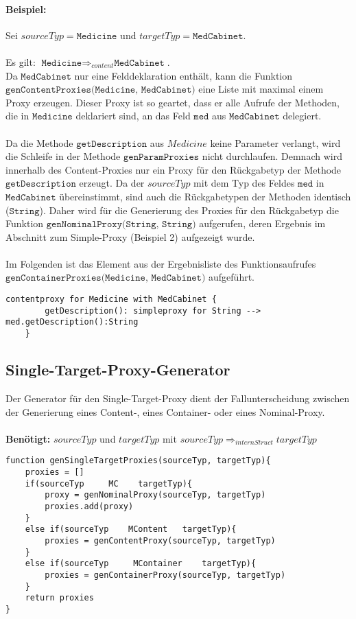 \documentclass[a4paper,12pt]{article}
\begin{document}
\paragraph{Beispiel: }Sei $sourceTyp = \texttt{Medicine}$ und $targetTyp = \texttt{MedCabinet}$.\\\\
Es gilt: $\texttt{Medicine} \Rightarrow_{content} \texttt{MedCabinet}$.\\
Da $\texttt{MedCabinet}$ nur eine Felddeklaration enthält, kann die Funktion $\texttt{genContentProxies(Medicine, MedCabinet)}$ eine Liste mit maximal einem Proxy erzeugen. Dieser Proxy ist so geartet, dass er alle Aufrufe der Methoden, die in $\texttt{Medicine}$ deklariert sind, an das Feld $\texttt{med}$ aus $\texttt{MedCabinet}$ delegiert.\\\\
Da die Methode $\texttt{getDescription}$ aus $Medicine$ keine Parameter verlangt, wird die Schleife in der Methode $\texttt{genParamProxies}$ nicht durchlaufen. Demnach wird innerhalb des Content-Proxies nur ein Proxy für den Rückgabetyp der Methode $\texttt{getDescription}$ erzeugt. Da der $sourceTyp$ mit dem Typ des Feldes $\texttt{med}$ in $\texttt{MedCabinet}$ übereinstimmt, sind auch die Rückgabetypen der Methoden identisch ($\texttt{String}$). Daher wird für die Generierung des Proxies für den Rückgabetyp die Funktion $\texttt{genNominalProxy(String, String)}$ aufgerufen, deren Ergebnis im Abschnitt zum Simple-Proxy (Beispiel 2) aufgezeigt wurde.\\\\
Im Folgenden ist das Element aus der Ergebnisliste des Funktionsaufrufes $\texttt{genContainerProxies(Medicine, MedCabinet)}$ aufgeführt.
\begin{lstlisting}[style = dsl]
	contentproxy for Medicine with MedCabinet {
		getDescription(): simpleproxy for String --> med.getDescription():String
	}
\end{lstlisting}


\subsection{Single-Target-Proxy-Generator}
Der Generator für den Single-Target-Proxy dient der Fallunterscheidung zwischen der Generierung eines Content-, eines Container- oder eines Nominal-Proxy.\\\\
\textbf{Benötigt: }$sourceTyp$ und $targetTyp$ mit $sourceTyp \Rightarrow_{internStruct} targetTyp$
\begin{lstlisting}[style = generator]
function genSingleTargetProxies(sourceTyp, targetTyp){
	proxies = []				
	if(sourceTyp     MC    targetTyp){
		proxy = genNominalProxy(sourceTyp, targetTyp)
		proxies.add(proxy)
	}
	else if(sourceTyp    MContent   targetTyp){
		proxies = genContentProxy(sourceTyp, targetTyp)
	}
	else if(sourceTyp     MContainer    targetTyp){
		proxies = genContainerProxy(sourceTyp, targetTyp)
	}
	return proxies
}
\end{lstlisting}
\end{document}

